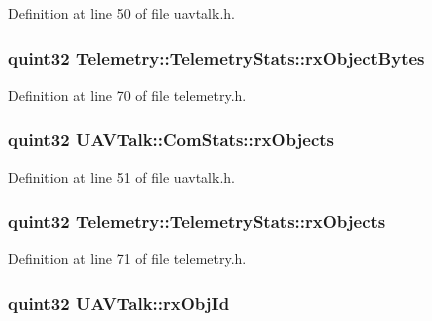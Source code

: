 \-Definition at line 50 of file uavtalk.\-h.

\hypertarget{group___u_a_v_talk_plugin_ga495b5acf35424dbdf221e81f0024ae92}{
\subsubsection[{rx\-Object\-Bytes}]{\setlength{\rightskip}{0pt plus 5cm}quint32 {\bf \-Telemetry\-::\-Telemetry\-Stats\-::rx\-Object\-Bytes}}}\label{group___u_a_v_talk_plugin_ga495b5acf35424dbdf221e81f0024ae92}


\-Definition at line 70 of file telemetry.\-h.

\hypertarget{group___u_a_v_talk_plugin_ga60c07de32f4130a7b761066819bf0712}{
\subsubsection[{rx\-Objects}]{\setlength{\rightskip}{0pt plus 5cm}quint32 {\bf \-U\-A\-V\-Talk\-::\-Com\-Stats\-::rx\-Objects}}}\label{group___u_a_v_talk_plugin_ga60c07de32f4130a7b761066819bf0712}


\-Definition at line 51 of file uavtalk.\-h.

\hypertarget{group___u_a_v_talk_plugin_gacd544f271fc6ee0f5eb72dc101a23c21}{
\subsubsection[{rx\-Objects}]{\setlength{\rightskip}{0pt plus 5cm}quint32 {\bf \-Telemetry\-::\-Telemetry\-Stats\-::rx\-Objects}}}\label{group___u_a_v_talk_plugin_gacd544f271fc6ee0f5eb72dc101a23c21}


\-Definition at line 71 of file telemetry.\-h.

\hypertarget{group___u_a_v_talk_plugin_ga922e3ea36927c84023cfb0cf719c9aa0}{
\subsubsection[{rx\-Obj\-Id}]{\setlength{\rightskip}{0pt plus 5cm}quint32 {\bf \-U\-A\-V\-Talk\-::rx\-Obj\-Id}}}\label{group___u_a_v_talk_plugin_ga922e3ea36927c84023cfb0cf719c9aa0}


